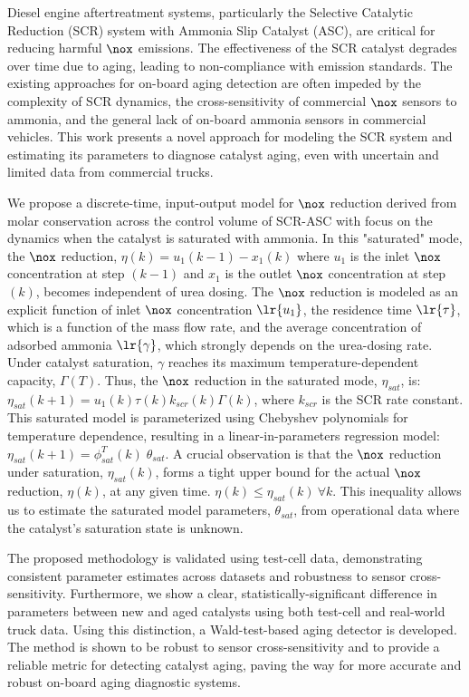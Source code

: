 Diesel engine aftertreatment systems, particularly the Selective Catalytic
Reduction (SCR) system with Ammonia Slip Catalyst (ASC), are critical for
reducing harmful $\nox$ emissions. The effectiveness of the SCR catalyst
degrades over time due to aging, leading to non-compliance with emission
standards. The existing approaches for on-board aging detection are often
impeded by the complexity of SCR dynamics, the cross-sensitivity of commercial
$\nox$ sensors to ammonia, and the general lack of on-board ammonia sensors in
commercial vehicles. This work presents a novel approach for modeling the SCR
system and estimating its parameters to diagnose catalyst aging, even with
uncertain and limited data from commercial trucks.

We propose a discrete-time, input-output model for $\nox$ reduction derived from
molar conservation across the control volume of SCR-ASC with focus on the
dynamics when the catalyst is saturated with ammonia. In this "saturated" mode,
the $\nox$ reduction, $\eta(k) = u_1(k-1) - x_1(k)$ where $u_1$ is the inlet
$\nox$ concentration at step $(k-1)$ and $x_1$ is the outlet $\nox$
concentration at step $(k)$, becomes independent of urea dosing. The $\nox$
reduction is modeled as an explicit function of inlet $\nox$ concentration
$\lr{u_1}$, the residence time $\lr{\tau}$, which is a function of the mass
flow rate, and the average concentration of adsorbed ammonia $\lr{\gamma}$,
which strongly depends on the urea-dosing rate. Under catalyst saturation,
$\gamma$ reaches its maximum temperature-dependent capacity, $\Gamma(T)$. Thus,
the $\nox$ reduction in the saturated mode, $\eta_{sat}$, is: $ \eta_{sat}
    (k+1) = u_1(k) \tau(k) k_{scr}(k) \Gamma (k) $, where $k_{scr}$ is the SCR rate
constant. This saturated model is parameterized using Chebyshev polynomials for
temperature dependence, resulting in a linear-in-parameters regression model: $
    \eta_{sat} (k+1) = \phi_{sat}^T(k) \; \theta_{sat} $. A crucial observation is
that the $\nox$ reduction under saturation, $\eta_{sat}(k)$, forms a tight
upper bound for the actual $\nox$ reduction, $\eta(k)$, at any given time. $
    \eta(k) \leq \eta_{sat}(k) \: \forall k $. This inequality allows us to
estimate the saturated model parameters, $\theta_{sat}$, from operational data
where the catalyst's saturation state is unknown.

The proposed methodology is validated using test-cell data, demonstrating
consistent parameter estimates across datasets and robustness to sensor
cross-sensitivity. Furthermore, we show a clear, statistically-significant
difference in parameters between new and aged catalysts using both test-cell
and real-world truck data. Using this distinction, a Wald-test-based aging
detector is developed. The method is shown to be robust to sensor
cross-sensitivity and to provide a reliable metric for detecting catalyst aging,
paving the way for more accurate and robust on-board aging diagnostic systems.